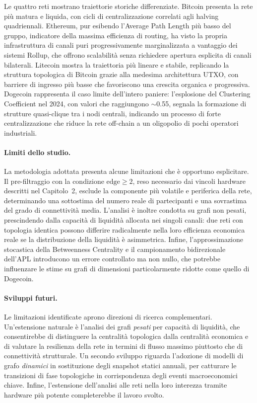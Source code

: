 \documentclass[12pt,a4paper,oneside]{book}
\begin{document}
Le quattro reti mostrano traiettorie storiche differenziate. Bitcoin presenta la rete più matura e liquida, con cicli di centralizzazione correlati agli halving quadriennali. Ethereum, pur esibendo l'Average Path Length più basso del gruppo, indicatore della massima efficienza di routing, ha visto la propria infrastruttura di canali puri progressivamente marginalizzata a vantaggio dei sistemi Rollup, che offrono scalabilità senza richiedere apertura esplicita di canali bilaterali. Litecoin mostra la traiettoria più lineare e stabile, replicando la struttura topologica di Bitcoin grazie alla medesima architettura UTXO, con barriere di ingresso più basse che favoriscono una crescita organica e progressiva. Dogecoin rappresenta il caso limite dell'intero paniere: l'esplosione del Clustering Coefficient nel 2024, con valori che raggiungono $\sim$0.55, segnala la formazione di strutture quasi-clique tra i nodi centrali, indicando un processo di forte centralizzazione che riduce la rete off-chain a un oligopolio di pochi operatori industriali.

\paragraph{Limiti dello studio.} La metodologia adottata presenta alcune limitazioni che è opportuno esplicitare. Il pre-filtraggio con la condizione $\text{edge} \ge 2$, reso necessario dai vincoli hardware descritti nel Capitolo~2, esclude la componente più volatile e periferica della rete, determinando una sottostima del numero reale di partecipanti e una sovrastima del grado di connettività media. L'analisi è inoltre condotta su grafi non pesati, prescindendo dalla capacità di liquidità allocata nei singoli canali: due reti con topologia identica possono differire radicalmente nella loro efficienza economica reale se la distribuzione della liquidità è asimmetrica. Infine, l'approssimazione stocastica della Betweenness Centrality e il campionamento bidirezionale dell'APL introducono un errore controllato ma non nullo, che potrebbe influenzare le stime su grafi di dimensioni particolarmente ridotte come quello di Dogecoin.

\paragraph{Sviluppi futuri.} Le limitazioni identificate aprono direzioni di ricerca complementari. Un'estensione naturale è l'analisi dei grafi \textit{pesati} per capacità di liquidità, che consentirebbe di distinguere la centralità topologica dalla centralità economica e di valutare la resilienza della rete in termini di flusso massimo piuttosto che di connettività strutturale. Un secondo sviluppo riguarda l'adozione di modelli di grafo \textit{dinamici} in sostituzione degli snapshot statici annuali, per catturare le transizioni di fase topologiche in corrispondenza degli eventi macroeconomici chiave. Infine, l'estensione dell'analisi alle reti nella loro interezza tramite hardware più potente completerebbe il lavoro svolto.

\newpage
\printbibliography
\end{document}
